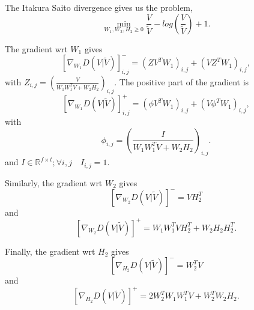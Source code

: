 \documentclass{article}
\begin{document}
The Itakura Saito divergence gives us the problem,
$$\min_{W_1,W_2,H_2 \geq 0} \frac{V}{\tilde{V}} - log(\frac{V}{\tilde{V}}) +1.$$

The gradient wrt $W_1$ gives
$$[\nabla_{W_1} D(V|\tilde{V})]_{i,j}^{-} = (ZV^TW_1)_{i,j} + (VZ^TW_1)_{i,j},$$
with $Z_{i,j} = (\frac{V}{W_1W_1^TV + W_2H_2})_{i,j}$. 
The positive part of the gradient is
$$[\nabla_{W_1} D(V|\tilde{V})]_{i,j}^{+} = (\phi V^TW_1)_{i,j} + (V \phi^T W_1)_{i,j},$$
with $$ \phi_{i,j} = (\frac{I}{W_1W_1^TV + W_2H_2})_{i,j}.$$ and $I \in \mathbb{R}^{f \times t} ; \forall i,j \quad I_{i,j}=1$.


Similarly, the gradient wrt $W_2$ gives
$$ [\nabla_{W_2} D(V|\tilde{V})]^{-} = VH_2^T $$
and
$$ [\nabla_{W_2} D(V|\tilde{V})]^{+} = W_1W_1^TVH_2^T + W_2H_2H_2^T.$$

Finally, the gradient wrt $H_2$ gives
$$ [\nabla_{H_2} D(V|\tilde{V})]^{-} = W_2^TV  $$
and
$$ [\nabla_{H_2} D(V|\tilde{V})]^{+} = 2W_2^TW_1W_1^TV + W_2^TW_2H_2. $$




\end{document}
